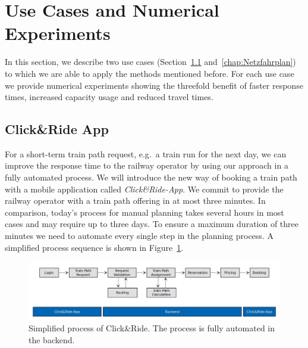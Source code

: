 \section{Use Cases and Numerical Experiments}
\label{chap:useCases}

In this section, we describe two use cases (Section~\ref{chap:CnR} and~\ref{chap:Netzfahrplan}) to which we are able to apply the methods mentioned before. For each use case we provide numerical experiments showing the threefold benefit of faster response times, increased capacity usage and reduced travel times.

\subsection{Click\&Ride App}
\label{chap:CnR}
For a short-term train path request, e.g.\ a train run for the next day, we can improve the response time to the railway operator by using our approach in a fully automated process. We will introduce the new way of booking a train path with a mobile application called \emph{Click\&Ride-App}. We commit to provide the railway operator with a train path offering in at most three minutes. In comparison, today's process for manual planning takes several hours in most cases and may require up to three days. To ensure a maximum duration of three minutes we need to automate every single step in the planning process. A simplified process sequence is shown in Figure~\ref{fig:process_sequence}.
%
\begin{figure}[htb]
	\centering
	\includegraphics[width=\textwidth]{Bilder/process_sequence.jpg}
	\caption{Simplified process of Click\&Ride. The process is fully automated in the backend.}
	\label{fig:process_sequence}
\end{figure}

